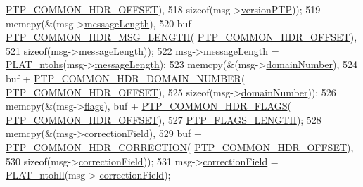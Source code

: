 \begin{DoxyCode}
{{{{{{{{{      \hyperlink{avbts__message_8hpp_a330dd502b6e19949d74c8f3a96dd5667}{PTP\_COMMON\_HDR\_OFFSET}),
518            \textcolor{keyword}{sizeof}(msg->\hyperlink{class_p_t_p_message_common_aebd1e0693c6170ff1b08b2471db92a80}{versionPTP}));
519     memcpy(&(msg->\hyperlink{class_p_t_p_message_common_a6c490faee54bca860c4d897aae50990f}{messageLength}),
520            buf + \hyperlink{avbts__message_8hpp_a6db27d50a88956a08a99f2eb7b020247}{PTP\_COMMON\_HDR\_MSG\_LENGTH}(
      \hyperlink{avbts__message_8hpp_a330dd502b6e19949d74c8f3a96dd5667}{PTP\_COMMON\_HDR\_OFFSET}),
521            \textcolor{keyword}{sizeof}(msg->\hyperlink{class_p_t_p_message_common_a6c490faee54bca860c4d897aae50990f}{messageLength}));
522     msg->\hyperlink{class_p_t_p_message_common_a6c490faee54bca860c4d897aae50990f}{messageLength} = \hyperlink{linux_2src_2platform_8cpp_a6b8f3e7b87b66fa774a07ddc67f883a7}{PLAT\_ntohs}(msg->\hyperlink{class_p_t_p_message_common_a6c490faee54bca860c4d897aae50990f}{messageLength});
523     memcpy(&(msg->\hyperlink{class_p_t_p_message_common_a0443527ff087aecea2cac4f6e84d189c}{domainNumber}),
524            buf + \hyperlink{avbts__message_8hpp_aeba19234aadc9ec2ce3ec7b439a79c54}{PTP\_COMMON\_HDR\_DOMAIN\_NUMBER}(
      \hyperlink{avbts__message_8hpp_a330dd502b6e19949d74c8f3a96dd5667}{PTP\_COMMON\_HDR\_OFFSET}),
525            \textcolor{keyword}{sizeof}(msg->\hyperlink{class_p_t_p_message_common_a0443527ff087aecea2cac4f6e84d189c}{domainNumber}));
526     memcpy(&(msg->\hyperlink{class_p_t_p_message_common_a8c2f6104634deb80d932fa0cd9166fba}{flags}), buf + \hyperlink{avbts__message_8hpp_a60148b9c4d7f51e723a3ae8dd73e7851}{PTP\_COMMON\_HDR\_FLAGS}(
      \hyperlink{avbts__message_8hpp_a330dd502b6e19949d74c8f3a96dd5667}{PTP\_COMMON\_HDR\_OFFSET}),
527            \hyperlink{avbts__message_8hpp_ad8b20c17c21a3024f129fc556d5382c2}{PTP\_FLAGS\_LENGTH});
528     memcpy(&(msg->\hyperlink{class_p_t_p_message_common_a635b707dac6610b5b159be5c8ec1891e}{correctionField}),
529            buf + \hyperlink{avbts__message_8hpp_a86a729fd44989d68c1ebe5c385839743}{PTP\_COMMON\_HDR\_CORRECTION}(
      \hyperlink{avbts__message_8hpp_a330dd502b6e19949d74c8f3a96dd5667}{PTP\_COMMON\_HDR\_OFFSET}),
530            \textcolor{keyword}{sizeof}(msg->\hyperlink{class_p_t_p_message_common_a635b707dac6610b5b159be5c8ec1891e}{correctionField}));
531     msg->\hyperlink{class_p_t_p_message_common_a635b707dac6610b5b159be5c8ec1891e}{correctionField} = \hyperlink{linux_2src_2platform_8cpp_ac83360d6774b1f7aee4267184ce6e974}{PLAT\_ntohll}(msg->
      \hyperlink{class_p_t_p_message_common_a635b707dac6610b5b159be5c8ec1891e}{correctionField});
}}}}}}}}}
\end{DoxyCode}
